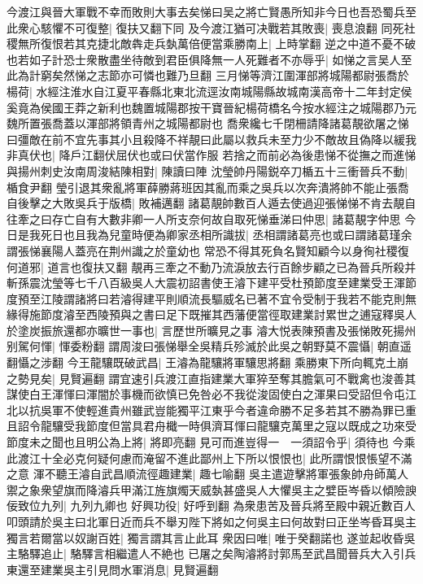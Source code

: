 今渡江與晉大軍戰不幸而敗則大事去矣悌曰吴之將亡賢愚所知非今日也吾恐蜀兵至此衆心駭懼不可復整|{
	復扶又翻下同}
及今渡江猶可决戰若其敗喪|{
	喪息浪翻}
同死社稷無所復恨若其克捷北敵犇走兵埶萬倍便當乘勝南上|{
	上時掌翻}
逆之中道不憂不破也若如子計恐士衆散盡坐待敵到君臣俱降無一人死難者不亦辱乎|{
	如悌之言吴人至此為計窮矣然悌之志節亦可憐也難乃旦翻}
三月悌等濟江圍渾部將城陽都尉張喬於楊荷|{
	水經注淮水自江夏平春縣北東北流逕汝南城陽縣故城南漢高帝十二年封定侯奚竟為侯國王莽之新利也魏置城陽郡按干寶晉紀楊荷橋名今按水經注之城陽郡乃元魏所置張喬蓋以渾部將領青州之城陽都尉也}
喬衆纔七千閉柵請降諸葛靚欲屠之悌曰彊敵在前不宜先事其小且殺降不祥靚曰此屬以救兵未至力少不敵故且偽降以緩我非真伏也|{
	降戶江翻伏屈伏也或曰伏當作服}
若捨之而前必為後患悌不從撫之而進悌與揚州刺史汝南周浚結陳相對|{
	陳讀曰陣}
沈瑩帥丹陽鋭卒刀楯五十三衝晉兵不動|{
	楯食尹翻}
瑩引退其衆亂將軍薛勝蔣班因其亂而乘之吳兵以次奔潰將帥不能止張喬自後擊之大敗吳兵于版橋|{
	敗補邁翻}
諸葛靚帥數百人遁去使過迎張悌悌不肯去靚自往牽之曰存亡自有大數非卿一人所支奈何故自取死悌垂涕曰仲思|{
	諸葛靚字仲思}
今日是我死日也且我為兒童時便為卿家丞相所識拔|{
	丞相謂諸葛亮也或曰謂諸葛瑾余謂張悌襄陽人蓋亮在荆州識之於童幼也}
常恐不得其死負名賢知顧今以身徇社稷復何道邪|{
	道言也復扶又翻}
靚再三牽之不動乃流淚放去行百餘步顧之已為晉兵所殺并斬孫震沈瑩等七千八百級吳人大震初詔書使王濬下建平受杜預節度至建業受王渾節度預至江陵謂諸將曰若濬得建平則順流長驅威名已著不宜令受制于我若不能克則無緣得施節度濬至西陵預與之書曰足下既摧其西藩便當徑取建業討累世之逋寇釋吳人於塗炭振旅還都亦曠世一事也|{
	言歷世所曠見之事}
濬大悦表陳預書及張悌敗死揚州别駕何惲|{
	惲委粉翻}
謂周浚曰張悌舉全吳精兵殄滅於此吳之朝野莫不震懾|{
	朝直遥翻懾之涉翻}
今王龍驤既破武昌|{
	王濬為龍驤將軍驤思將翻}
乘勝東下所向輒克土崩之勢見矣|{
	見賢遍翻}
謂宜速引兵渡江直指建業大軍猝至奪其膽氣可不戰禽也浚善其謀使白王渾惲曰渾闇於事機而欲慎已免咎必不我從浚固使白之渾果曰受詔但令屯江北以抗吳軍不使輕進貴州雖武豈能獨平江東乎今者違命勝不足多若其不勝為罪已重且詔令龍驤受我節度但當具君舟檝一時俱濟耳惲曰龍驤克萬里之寇以既成之功來受節度未之聞也且明公為上將|{
	將即亮翻}
見可而進豈得一　一須詔令乎|{
	須待也}
今乘此渡江十全必克何疑何慮而淹留不進此鄙州上下所以恨恨也|{
	此所謂恨恨悵望不滿之意}
渾不聽王濬自武昌順流徑趣建業|{
	趣七喻翻}
吳主遣遊擊將軍張象帥舟師萬人禦之象衆望旗而降濬兵甲滿江旌旗燭天威埶甚盛吳人大懼吳主之嬖臣岑昏以傾險諛佞致位九列|{
	九列九卿也}
好興功役|{
	好呼到翻}
為衆患苦及晉兵將至殿中親近數百人叩頭請於吳主曰北軍日近而兵不舉刃陛下將如之何吳主曰何故對曰正坐岑昏耳吳主獨言若爾當以奴謝百姓|{
	獨言謂其言止此耳}
衆因曰唯|{
	唯于癸翻諾也}
遂並起收昏吳主駱驛追止|{
	駱驛言相繼遣人不絶也}
已屠之矣陶濬將討郭馬至武昌聞晉兵大入引兵東還至建業吳主引見問水軍消息|{
	見賢遍翻}
